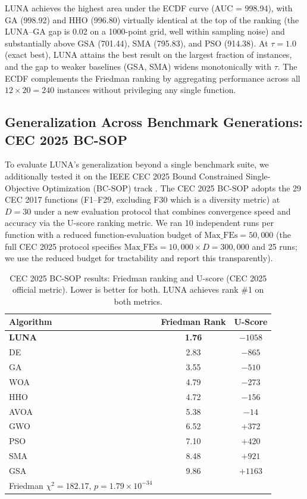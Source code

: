 \documentclass[review]{elsarticle}
\theoremstyle{definition}
\begin{document}
LUNA achieves the highest area under the ECDF curve (AUC = 998.94), with GA (998.92) and HHO (996.80) virtually identical at the top of the ranking (the LUNA--GA gap is 0.02 on a 1000-point grid, well within sampling noise) and substantially above GSA (701.44), SMA (795.83), and PSO (914.38). At $\tau = 1.0$ (exact best), LUNA attains the best result on the largest fraction of instances, and the gap to weaker baselines (GSA, SMA) widens monotonically with $\tau$. The ECDF complements the Friedman ranking by aggregating performance across all $12 \times 20 = 240$ instances without privileging any single function.

\subsection{Generalization Across Benchmark Generations: CEC 2025 BC-SOP}
\label{sec:cec2025}

To evaluate LUNA's generalization beyond a single benchmark suite, we additionally tested it on the IEEE CEC 2025 Bound Constrained Single-Objective Optimization (BC-SOP) track \cite{cec2025}. The CEC 2025 BC-SOP adopts the 29 CEC 2017 functions \cite{cec2017} (F1--F29, excluding F30 which is a diversity metric) at $D=30$ under a new evaluation protocol that combines convergence speed and accuracy via the U-score ranking metric. We ran 10 independent runs per function with a reduced function-evaluation budget of $\mathrm{Max\_FEs} = 50{,}000$ (the full CEC 2025 protocol specifies $\mathrm{Max\_FEs} = 10{,}000 \times D = 300{,}000$ and 25 runs; we use the reduced budget for tractability and report this transparently).

\begin{table}[htbp]
\centering
\caption{CEC 2025 BC-SOP results: Friedman ranking and U-score (CEC 2025 official metric). Lower is better for both. LUNA achieves rank \#1 on both metrics.}
\label{tab:cec2025}
\begin{tabular}{lcc}
\toprule
\textbf{Algorithm} & \textbf{Friedman Rank} & \textbf{U-Score} \\
\midrule
\textbf{LUNA} & \textbf{1.76} & \textbf{$-1058$} \\
DE & 2.83 & $-865$ \\
GA & 3.55 & $-510$ \\
WOA & 4.79 & $-273$ \\
HHO & 4.72 & $-156$ \\
AVOA & 5.38 & $-14$ \\
GWO & 6.52 & $+372$ \\
PSO & 7.10 & $+420$ \\
SMA & 8.48 & $+921$ \\
GSA & 9.86 & $+1163$ \\
\midrule
Friedman $\chi^2 = 182.17$, $p = 1.79 \times 10^{-34}$ & & \\
\bottomrule
\end{tabular}
\end{table}
\end{document}
